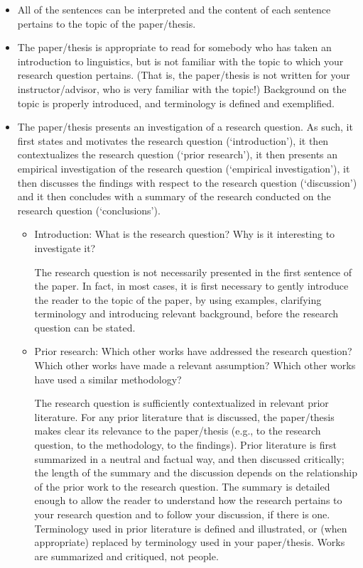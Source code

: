 \documentclass[11pt,fleqn,a4paper/thesis]{article}
\newcommand{\6}{\mbox{$[\hspace*{-.6mm}[$}}
\newcommand{\9}{\mbox{$]\hspace*{-.6mm}]$}}
\begin{document}
\begin{itemize}[itemsep=-1pt,leftmargin=2.5ex,topsep=-2pt]

\item All of the sentences can be interpreted and the content of each sentence pertains to the topic of the paper/thesis.

\item The paper/thesis is appropriate to read for somebody who has taken an introduction to linguistics, but is not familiar with the topic to which your research question pertains. (That is, the paper/thesis is not written for your instructor/advisor, who is very familiar with the topic!) Background on the topic is properly introduced, and terminology is defined and exemplified. 

\item The paper/thesis presents an investigation of a research question. As such, it first states and motivates the research question (`introduction'), it then contextualizes the research question (`prior research'), it then presents an empirical investigation of the research question (`empirical investigation'), it then discusses the findings with respect to the research question (`discussion') and it then concludes with a summary of the research conducted on the research question (`conclusions').

\begin{itemize}[leftmargin=2.5ex,topsep=-2pt]

\item Introduction: What is the research question? Why is it interesting to investigate it? 

The research question is not necessarily presented in the first sentence of the paper. In fact, in most cases, it is first necessary to gently introduce the reader to the topic of the paper, by using examples, clarifying terminology and introducing relevant background, before the research question can be stated.

\item Prior research: Which other works have addressed the research question? Which other works have made a relevant assumption? Which other works have used a similar methodology?

The research question is sufficiently contextualized in relevant prior literature. For any prior literature that is discussed, the paper/thesis makes clear its relevance to the paper/thesis (e.g., to the research question, to the methodology, to the findings). Prior literature is first summarized in a neutral and factual way, and then discussed critically; the length of the summary and the discussion depends on the relationship of the prior work to the research question. The summary is detailed enough to allow the reader to understand how the research pertains to your research question and to follow your discussion, if there is one. Terminology used in prior literature is defined and illustrated, or (when appropriate) replaced by terminology used in your paper/thesis. Works are summarized and critiqued, not people.


\end{itemize}
\end{itemize}
\end{document}
